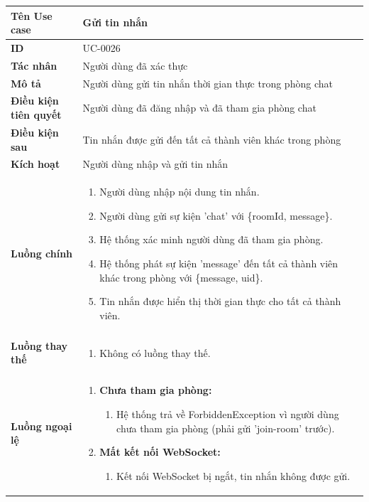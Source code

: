 {
\renewcommand{\arraystretch}{1.5}

\begin{tabularx}{\textwidth}{|>{\raggedright\arraybackslash}X|>{\raggedright\arraybackslash}X|}
\hline
\textbf{Tên Use case} & Gửi tin nhắn \\
\hline
\textbf{ID} & UC-0026 \\
\hline
\textbf{Tác nhân} & Người dùng đã xác thực \\
\hline
\textbf{Mô tả} & Người dùng gửi tin nhắn thời gian thực trong phòng chat \\
\hline
\textbf{Điều kiện tiên quyết} & Người dùng đã đăng nhập và đã tham gia phòng chat \\
\hline
\textbf{Điều kiện sau} & Tin nhắn được gửi đến tất cả thành viên khác trong phòng \\
\hline
\textbf{Kích hoạt} & Người dùng nhập và gửi tin nhắn \\
\hline
\textbf{Luồng chính} &
\begin{enumerate}
    \item Người dùng nhập nội dung tin nhắn.
    \item Người dùng gửi sự kiện 'chat' với \{roomId, message\}.
    \item Hệ thống xác minh người dùng đã tham gia phòng.
    \item Hệ thống phát sự kiện 'message' đến tất cả thành viên khác trong phòng với \{message, uid\}.
    \item Tin nhắn được hiển thị thời gian thực cho tất cả thành viên.
\end{enumerate} \\
\hline
\textbf{Luồng thay thế} &
\begin{enumerate}
    \item Không có luồng thay thế.
\end{enumerate} \\
\hline
\textbf{Luồng ngoại lệ} &
\begin{enumerate}
    \item \textbf{Chưa tham gia phòng:}
    \begin{enumerate}
        \item[3Err.] Hệ thống trả về ForbiddenException vì người dùng chưa tham gia phòng (phải gửi 'join-room' trước).
    \end{enumerate}
    \item \textbf{Mất kết nối WebSocket:}
    \begin{enumerate}
        \item[2Err.] Kết nối WebSocket bị ngắt, tin nhắn không được gửi.
    \end{enumerate}
\end{enumerate} \\
\hline
\end{tabularx}
}
